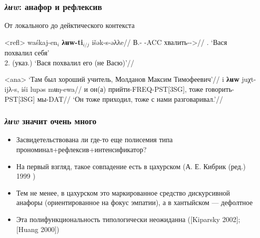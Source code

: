 \documentclass{beamer}
\begin{document}
\begin{frame}
    \frametitle{\textit{λʉw}: анафор и рефлексив}
    
    От локального до дейктического контекста 
    
    \ex<refl>
    \begingl
    \gla waśkaj-en$_i$		\textbf{λʉw-ti}$_{i/j}$	išək-s-əλλe//
    \glb В.-\Pssg{} 	\Int-ACC 	хвалить-\Pst{}-\Tsg{}>\Sg{}//
    . ‘Вася похвалил  себя’\\
    2. (указ.) ‘Вася похвалил его (не Васю)’//
    \endgl        
    \xe
    
    \ex<ana>
    \begingl
    \glpreamble ‘Там был хороший учитель, Молданов Максим Тимофеевич’//
    \gla i	\textbf{λʉw}		juχt-ijλ-s,				iśi	lupəs				mʉŋ-ewa//
    \glb и 	он(а) 	прийти-FREQ-PST[3SG], 	тоже говорить-PST[3SG] 	мы-DAT//
    \glft ‘Он тоже приходил, тоже с нами разговаривал.’//
    \endgl
    \xe
    
\end{frame}

\begin{frame}
    \frametitle{\textit{λʉw} значит очень много}

    \begin{itemize}
        \item Засвидетельствована ли где-то еще полисемия типа прономинал+рефлексив+интенсификатор? 
        \item На первый взгляд, такое совпадение есть в цахурском (А. Е. Кибрик (ред.) 1999 ) 
        \item Тем не менее, в цахурском это маркированное средство дискурсивной анафоры (ориентированное на фокус эмпатии), а в хантыйском — дефолтное
        \item Эта полифункциональность типологически неожиданна ([Kiparsky 2002]; [Huang 2000]) 
    \end{itemize}

\end{frame}
\end{document}
